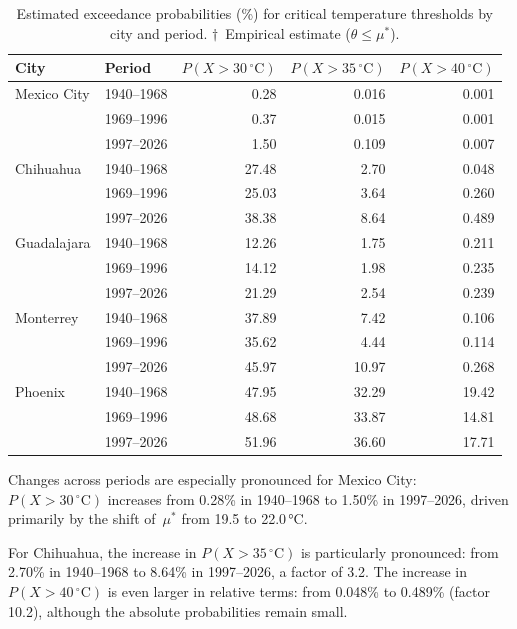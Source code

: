 \documentclass[APA,STIX1COL]{WileyNJD-v2}
\begin{document}
\begin{table}[ht]
\centering
\begin{tabular}{llrrr}
\toprule
City & Period &
  $P(X>30\,{}^\circ\text{C})$ &
  $P(X>35\,{}^\circ\text{C})$ &
  $P(X>40\,{}^\circ\text{C})$ \\
\midrule
Mexico City & 1940--1968 &  0.28 & 0.016 & 0.001 \\
            & 1969--1996 &  0.37 & 0.015 & 0.001 \\
            & 1997--2026 &  1.50 & 0.109 & 0.007 \\
\midrule
Chihuahua   & 1940--1968 & 27.48 & 2.70  & 0.048 \\
            & 1969--1996 & 25.03 & 3.64  & 0.260 \\
            & 1997--2026 & 38.38 & 8.64  & 0.489 \\
\midrule
Guadalajara & 1940--1968 & 12.26 & 1.75  & 0.211 \\
            & 1969--1996 & 14.12 & 1.98  & 0.235 \\
            & 1997--2026 & 21.29 & 2.54  & 0.239 \\
\midrule
Monterrey   & 1940--1968 & 37.89 & 7.42  & 0.106 \\
            & 1969--1996 & 35.62 & 4.44  & 0.114 \\
            & 1997--2026 & 45.97 & 10.97 & 0.268 \\
\midrule
Phoenix     & 1940--1968 & 47.95 & 32.29 & 19.42 \\
            & 1969--1996 & 48.68 & 33.87 & 14.81 \\
            & 1997--2026 & 51.96 & 36.60 & 17.71 \\
\bottomrule
\end{tabular}
\caption{Estimated exceedance probabilities (\%) for critical
temperature thresholds by city and period.
$\dagger$~Empirical estimate ($\theta\leq\mu^*$).}
\label{tab:excedencias}
\end{table}

Changes across periods are especially pronounced for Mexico City:
$P(X>30\,{}^\circ\text{C})$ increases from 0.28\% in 1940--1968
to 1.50\% in 1997--2026, driven primarily by the shift of~$\mu^*$
from 19.5 to 22.0\,°C.

For Chihuahua, the increase in $P(X>35\,{}^\circ\text{C})$ is
particularly pronounced: from 2.70\% in 1940--1968 to 8.64\% in
1997--2026, a factor of 3.2. The increase in
$P(X>40\,{}^\circ\text{C})$ is even larger in relative terms:
from 0.048\% to 0.489\% (factor 10.2), although the absolute
probabilities remain small.
\end{document}
